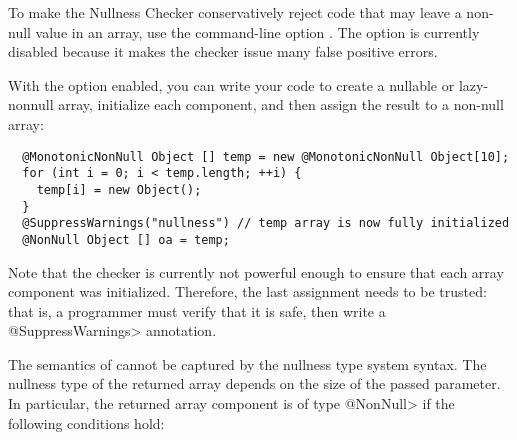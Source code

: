 To make the Nullness Checker conservatively reject code that may leave a
non-null value in an array, use the command-line option
.  The option is currently disabled
because it makes the checker issue many false positive errors.

With the option enabled, you can write your code to create a nullable or
lazy-nonnull array, initialize
each component, and then assign the result to a non-null array:

\begin{Verbatim}
  @MonotonicNonNull Object [] temp = new @MonotonicNonNull Object[10];
  for (int i = 0; i < temp.length; ++i) {
    temp[i] = new Object();
  }
  @SuppressWarnings("nullness") // temp array is now fully initialized
  @NonNull Object [] oa = temp;
\end{Verbatim}

Note that the checker is currently not powerful enough to ensure that
each array component was initialized. Therefore, the last assignment
needs to be trusted:  that is, a programmer must verify that it is safe,
then write a \<@SuppressWarnings> annotation.





The semantics of
cannot be captured by the nullness type system syntax. The nullness type of the
returned array depends on the size of the passed parameter. In particular, the
returned array component is of type \<@NonNull> if the following conditions
hold:

